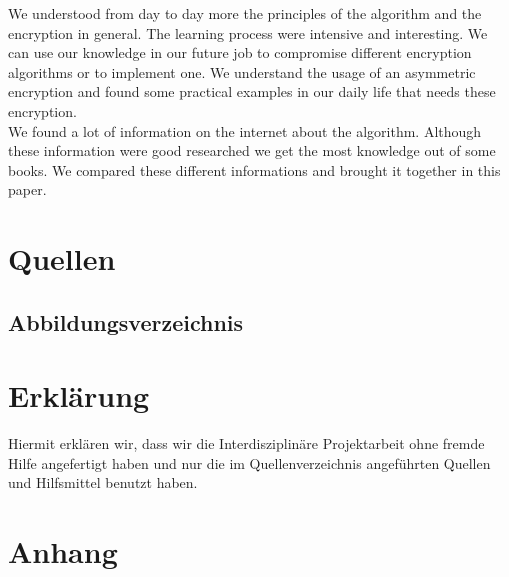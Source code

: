 We understood from day to day more the principles of the algorithm and the encryption in general. The learning process were intensive and interesting. We can use our knowledge in our future job to compromise different encryption algorithms or to implement one. We understand the usage of an asymmetric encryption and found some practical examples in our daily life that needs these encryption.\\ 
We found a lot of information on the internet about the algorithm. Although these information were good researched we get the most knowledge out of some books. We compared these different informations and brought it together in this paper.

\section{Quellen}
\subsection{Abbildungsverzeichnis}
\section{Erklärung}
Hiermit erklären wir, dass wir die Interdisziplinäre Projektarbeit ohne fremde Hilfe angefertigt haben und nur die im Quellenverzeichnis angeführten Quellen und Hilfsmittel benutzt haben.
\section{Anhang}
